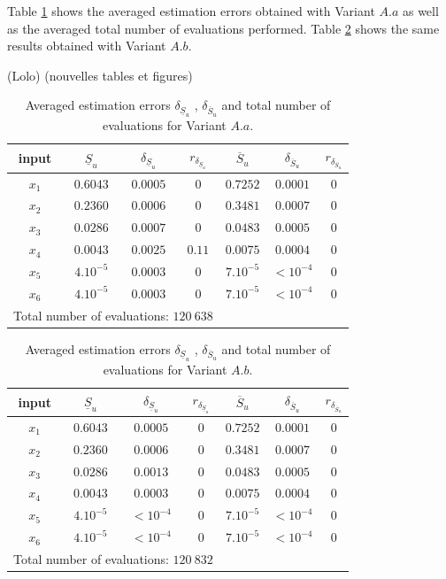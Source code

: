 Table \ref{res.gfunc.Aa} shows the averaged estimation errors obtained with Variant $A.a$ as well as the averaged total number of evaluations performed. Table \ref{res.gfunc.Ab} shows the same results obtained with Variant $A.b$.
\renewcommand{\arraystretch}{1.25}
{\color{purple}(Lolo) (nouvelles tables et figures)
\begin{table}[t]
\caption{Averaged estimation errors $\delta_{\underline{S}_u}$ , $\delta_{\overline{S}_u}$ and total number of evaluations for Variant $A.a$.}
\centering
\begin{tabular}{ccccccc}
\hline
 input & $\underline{S}_u$ & $\delta_{\underline{S}_u}$ & $r_{\delta_{\underline{S}_u}}$ & $\overline{S}_u$ & $\delta_{\overline{S}_u}$ &$r_{\delta_{\overline{S}_u}}$ \\ \hline
 $x_1$ & $0.6043$ &  $0.0005$ & $0$ & $0.7252$ & $0.0001$ & $0$ \\ \hline
 $x_2$ & $0.2360$ &  $0.0006$ & $0$ & $0.3481$ & $0.0007$ & $0$ \\ \hline
 $x_3$ & $0.0286$ &  $0.0007$ & $0$ & $0.0483$ & $0.0005$ & $0$ \\ \hline
 $x_4$ & $0.0043$ &  $0.0025$ & $0.11$ & $0.0075$ & $0.0004$ & $0$ \\ \hline
 $x_5$ & $4.10^{-5}$ & $0.0003$ & $0$ & $7.10^{-5}$ & $< 10^{-4}$ & $0$ \\ \hline
 $x_6$ & $4.10^{-5}$ & $0.0003$ & $0$  & $7.10^{-5}$ & $< 10^{-4}$ & $0$ \\ \hline \hline
\multicolumn{4}{l}{Total number of evaluations: $120 \ 638$} & & &\\ \hline 
\end{tabular}
\label{res.gfunc.Aa}
\end{table}
\begin{table}[t]
\caption{Averaged estimation errors $\delta_{\underline{S}_u}$ , $\delta_{\overline{S}_u}$ and total number of evaluations for Variant $A.b$.}
\centering
\begin{tabular}{ccccccc}
\hline
 input & $\underline{S}_u$ & $\delta_{\underline{S}_u}$ & $r_{\delta_{\underline{S}_u}}$ & $\overline{S}_u$ & $\delta_{\overline{S}_u}$ &$r_{\delta_{\overline{S}_u}}$ \\ \hline
 $x_1$ & $0.6043$ &  $0.0005$ & $0$ & $0.7252$ & $0.0001$ & $0$ \\ \hline
 $x_2$ & $0.2360$ &  $0.0006$ & $0$ & $0.3481$ & $0.0007$ & $0$ \\ \hline
 $x_3$ & $0.0286$ &  $0.0013$ & $0$ & $0.0483$ & $0.0005$ & $0$ \\ \hline
 $x_4$ & $0.0043$ &  $0.0003$ & $0$ & $0.0075$ & $0.0004$ & $0$ \\ \hline
 $x_5$ & $4.10^{-5}$ & $< 10^{-4}$ & $0$ & $7.10^{-5}$ & $< 10^{-4}$ & $0$ \\ \hline
 $x_6$ & $4.10^{-5}$ & $< 10^{-4}$ & $0$  & $7.10^{-5}$ & $< 10^{-4}$ & $0$ \\ \hline \hline
\multicolumn{4}{l}{Total number of evaluations: $120 \ 832$} & & &\\ \hline 
\end{tabular}
\label{res.gfunc.Ab}
\end{table}}

